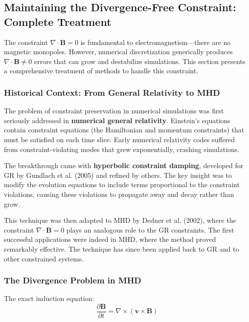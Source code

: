 \documentclass[12pt,a4paper]{article}
\begin{document}
\subsection{Maintaining the Divergence-Free Constraint: Complete Treatment}

The constraint $\nabla \cdot \bm{B} = 0$ is fundamental to electromagnetism---there are
no magnetic monopoles. However, numerical discretization generically produces
$\nabla \cdot \bm{B} \neq 0$ errors that can grow and destabilize simulations.
This section presents a comprehensive treatment of methods to handle this constraint.

\subsubsection{Historical Context: From General Relativity to MHD}

The problem of constraint preservation in numerical simulations was first seriously
addressed in \textbf{numerical general relativity}. Einstein's equations contain
constraint equations (the Hamiltonian and momentum constraints) that must be
satisfied on each time slice. Early numerical relativity codes suffered from
constraint-violating modes that grew exponentially, crashing simulations.

The breakthrough came with \textbf{hyperbolic constraint damping}, developed for
GR by Gundlach et al. (2005) and refined by others. The key insight was to
modify the evolution equations to include terms proportional to the constraint
violations, causing these violations to propagate away and decay rather than grow.

This technique was then adapted to MHD by Dedner et al. (2002), where the
constraint $\nabla \cdot \bm{B} = 0$ plays an analogous role to the GR constraints.
The first successful applications were indeed in MHD, where the method proved
remarkably effective. The technique has since been applied back to GR and to
other constrained systems.

\subsubsection{The Divergence Problem in MHD}

The exact induction equation:
\begin{equation}
\frac{\partial \bm{B}}{\partial t} = \nabla \times (\bm{v} \times \bm{B})
\label{eq:exact_induction}
\end{equation}
\end{document}
